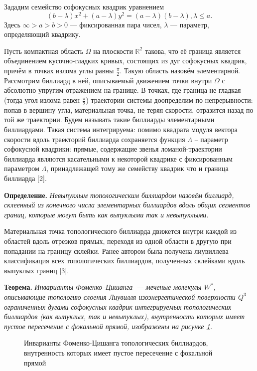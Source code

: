 


\vzmscaption

Зададим семейство софокусных квадрик уравнением
$$(b-\lambda)x^2+(a-\lambda)y^2=(a-\lambda)(b-\lambda),   \lambda\leqslant a.    $$
Здесь $\infty> a> b>0$ --- фиксированная   пара чисел, $\lambda$ ---
параметр, определяющий квадрику.

Пусть  компактная область $\Omega$  на плоскости $\mathbb{R}^2$  такова,
что её граница  является объединением кусочно-гладких \!\!\;кривых,
состоящих из дуг софокусных квадрик, причём в точках излома  углы равны $\frac{\pi}{2}$. Такую область назовём элементарной.
Рассмотрим   биллиард  в ней, описываемый движением   точки внутри  $\Omega$ с
абсолютно упругим отражением на границе. В точках,
где граница   не гладкая
(тогда   угол излома  равен $\frac{\pi}{2}$)
 траектории системы  доопределим по непрерывности:  попав в вершину угла, материальная точка, не теряя скорости, отразится назад по той же траектории.  Будем называть такие биллиарды элементарными биллиардами.
 Такая система   интегрируема: помимо квадрата модуля вектора скорости   вдоль траекторий биллиарда сохраняется функция $\Lambda$ -- параметр софокусной квадрики: прямые, содержащие звенья ломаной-траектории биллиарда являются касательными к некоторой квадрике с фиксированным параметром $\Lambda$, принадлежащей тому же семейству квадрик что и граница биллиарда [2].

\textbf{Определение.}
{\it Невыпуклым  топологическим   биллиардом   назовём биллиард,  склеенный из конечного числа элементарных биллиардов вдоль общих   сегментов границ, которые могут быть как выпуклыми так и невыпуклыми.}

Материальная точка  топологического биллиарда дви\-же\-т\-ся внутри каждой из областей вдоль отрезков прямых,
переходя из одной области в другую при попадании на границу склейки.
Ранее автором была получена ли\-у\-вил\-ле\-ва классификация всех  топологических биллиардов,
полученных склейками вдоль выпуклых границ [3].

\textbf{Теорема.}
{\it Инварианты Фоменко--Цишанга~--- меченые молекулы $W^*$,
описывающие топологию слоения Лиувилля изоэнергетической поверхности $Q^3$
ограниченных дугами софокусных квадрик интегрируемых топологических биллиардов (как выпуклых, так и невыпуклых),
внутренность которых имеет пустое пересечение с фокальной прямой,   изображены на рисунке \ref{moleculesSimple}.
}
 \begin{figure}[h!]

\caption{Инварианты Фоменко-Цишанга топологических    биллиардов, внутренность которых имеет пустое пересечение с фокальной прямой}
\label{moleculesSimple}
 \end{figure}


